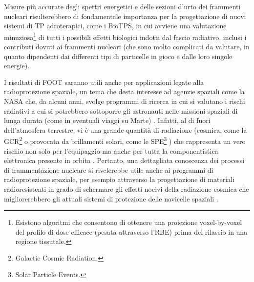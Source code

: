 \documentclass[12pt,a4paper,twoside]{report}
\begin{document}
	Misure più accurate degli spettri energetici e delle sezioni d'urto dei frammenti nucleari risulterebbero di fondamentale importanza per la progettazione di nuovi sistemi di TP adroterapici, come i BioTPS, in cui avviene una valutazione minuziosa\footnote{Esistono algoritmi \cite{steinstrater2015integration} che consentono di ottenere una proiezione voxel-by-voxel del profilo di dose efficace (pesata attraverso l'RBE) prima del rilascio in una regione tissutale.} di tutti i possibili effetti biologici indotti dal fascio radiativo, inclusi i contributi dovuti ai frammenti nucleari (che sono molto complicati da valutare, in quanto dipendenti dai differenti tipi di particelle in gioco e dalle loro singole energie).
	
	I risultati di FOOT saranno utili anche per applicazioni legate alla radioprotezione spaziale, un tema che desta interesse ad agenzie spaziali come la NASA che, da alcuni anni, svolge programmi di ricerca in cui si valutano i rischi radiativi a cui si potrebbero sottoporre gli astronauti nelle missioni spaziali di lunga durata (come in eventuali viaggi su Marte) \cite{RevModPhys.83.1245}. Infatti, al di fuori dell'atmosfera terrestre, vi è una grande quantità di radiazione (cosmica, come la GCR\footnote{Galactic Cosmic Radiation.} o provocata da brillamenti solari, come le SPE\footnote{Solar Particle Events.} \cite{ridolfiArticle}) che rappresenta un vero rischio non solo per l'equipaggio ma anche per tutta la componentistica elettronica presente in orbita \cite{foot_site}. Pertanto, una dettagliata conoscenza dei processi di frammentazione nucleare si rivelerebbe utile anche ai programmi di radioprotezione spaziale, per esempio attraverso la progettazione di materiali radioresistenti in grado di schermare gli effetti nocivi della radiazione cosmica che migliorerebbero gli attuali sistemi di protezione delle navicelle spaziali \cite{foot_cdr}.
	
\end{document}
